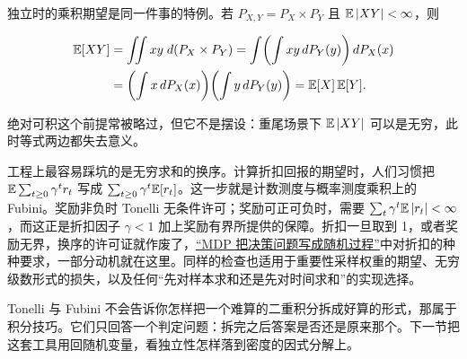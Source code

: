 独立时的乘积期望是同一件事的特例。若 \(P_{X,Y}=P_X\times P_Y\) 且 \(\mathbb{E}\left|XY\right|<\infty\)，则

\[
\begin{aligned}
\mathbb{E}[XY]
&=\iint xy\;d(P_X\times P_Y)
=\int\!\left(\int xy\,dP_Y(y)\right)dP_X(x)\\
&=\left(\int x\,dP_X(x)\right)\!\left(\int y\,dP_Y(y)\right)
=\mathbb{E}[X]\,\mathbb{E}[Y].
\end{aligned}
\]

绝对可积这个前提常被略过，但它不是摆设：重尾场景下 \(\mathbb{E}\left|XY\right|\) 可以是无穷，此时等式两边都失去意义。

工程上最容易踩坑的是无穷求和的换序。计算折扣回报的期望时，人们习惯把 \(\mathbb{E}\sum_{t\ge0}\gamma^t r_t\) 写成 \(\sum_{t\ge0}\gamma^t\mathbb{E}[r_t]\)。这一步就是计数测度与概率测度乘积上的 Fubini。奖励非负时 Tonelli 无条件许可；奖励可正可负时，需要 \(\sum_t\gamma^t\mathbb{E}\left|r_t\right|<\infty\)，而这正是折扣因子 \(\gamma<1\) 加上奖励有界所提供的保障。折扣一旦取到 1，或者奖励无界，换序的许可证就作废了，\hyperref[sec:16-Control-and-Reinforcement-Learning/02-Reinforcement-Learning/01]{``MDP 把决策问题写成随机过程''}中对折扣的种种要求，一部分动机就在这里。同样的检查也适用于重要性采样权重的期望、无穷级数形式的损失，以及任何``先对样本求和还是先对时间求和''的实现选择。

Tonelli 与 Fubini 不会告诉你怎样把一个难算的二重积分拆成好算的形式，那属于积分技巧。它们只回答一个判定问题：拆完之后答案是否还是原来那个。下一节把这套工具用回随机变量，看独立性怎样落到密度的因式分解上。
